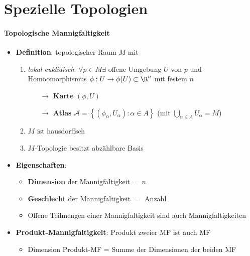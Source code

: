 \section{Spezielle Topologien}

\paragraph{Topologische Mannigfaltigkeit}
\begin{itemize}
  \item \textbf{Definition}: topologischer Raum \( M \) mit
  \begin{enumerate}
    \item \emph{lokal euklidisch}: \( \forall p \in M \exists \) offene Umgebung \( U \) von \( p \) und Homöomorphismus \( \phi: U \to \phi(U) \subset \R^n \) mit festem \( n \)
    \begin{itemize}
      \item[\( \to \)] \textbf{Karte} \( (\phi, U) \)
      \item[\( \to \)] \textbf{Atlas} \( \mathcal{A} = \left \{ \left( \phi_\alpha,U_\alpha \right) : \alpha \in A \right \} \) (mit \( \bigcup_{\alpha \in A} U_\alpha = M \))
    \end{itemize}
    \item \( M \) ist hausdorffsch
    \item \( M \)-Topologie besitzt abzählbare Basis
  \end{enumerate}
  \item \textbf{Eigenschaften}:
  \begin{itemize}
    \item \textbf{Dimension} der Mannigfaltigkeit \( = n \)
    \item \textbf{Geschlecht} der Mannigfaltigkeit \( = \) Anzahl 
    \item Offene Teilmengen einer Mannigfaltigkeit sind auch Mannigfaltigkeiten
  \end{itemize}
  \item \textbf{Produkt-Mannigfaltigkeit}: Produkt zweier MF ist auch MF
  \begin{itemize}
    \item Dimension Produkt-MF = Summe der Dimensionen der beiden MF
  \end{itemize}
\end{itemize}

